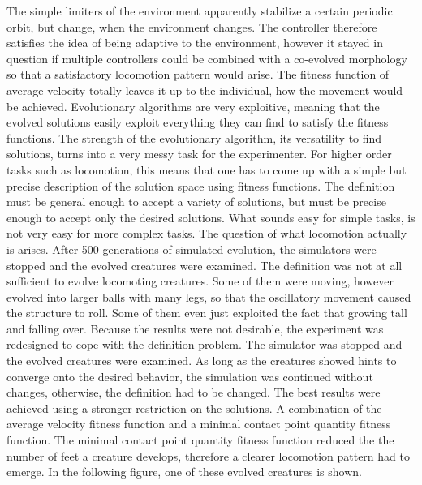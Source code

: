 \documentclass[main]{subfiles}
\begin{document}
The simple limiters of the environment apparently stabilize a certain periodic orbit, but change, when the environment changes. %
%
The controller therefore satisfies the idea of being adaptive to the environment, however it stayed in question if multiple controllers could be combined with a co-evolved morphology so that a satisfactory locomotion pattern would arise. %
%
The fitness function of average velocity totally leaves it up to the individual, how the movement would be achieved. %
%
Evolutionary algorithms are very exploitive, meaning that the evolved solutions easily exploit everything they can find to satisfy the fitness functions. %
%
The strength of the evolutionary algorithm, its versatility to find solutions, turns into a very messy task for the experimenter. %
%
For higher order tasks such as locomotion, this means that one has to come up with a simple but precise description of the solution space using fitness functions. %
%
The definition must be general enough to accept a variety of solutions, but must be precise enough to accept only the desired solutions. %
%
What sounds easy for simple tasks, is not very easy for more complex tasks. The question of what locomotion actually is arises. %
%
After 500 generations of simulated evolution, the simulators were stopped and the evolved creatures were examined. %
%
The definition was not at all sufficient to evolve locomoting creatures. %
%
Some of them were moving, however evolved into larger balls with many legs, so that the oscillatory movement caused the structure to roll. %
%
Some of them even just exploited the fact that growing tall and falling over. %
%
Because the results were not desirable, the experiment was redesigned to cope with the definition problem. %
%
The simulator was stopped and the evolved creatures were examined. %
%
As long as the creatures showed hints to converge onto the desired behavior, the simulation was continued without changes, otherwise, the definition had to be changed. %
%
The best results were achieved using a stronger restriction on the solutions. %
%
A combination of the average velocity fitness function and a minimal contact point quantity fitness function. %
%
The minimal contact point quantity fitness function reduced the the number of feet a creature develops, therefore a clearer locomotion pattern had to emerge. %
%
In the following figure, one of these evolved creatures is shown.
\end{document}
